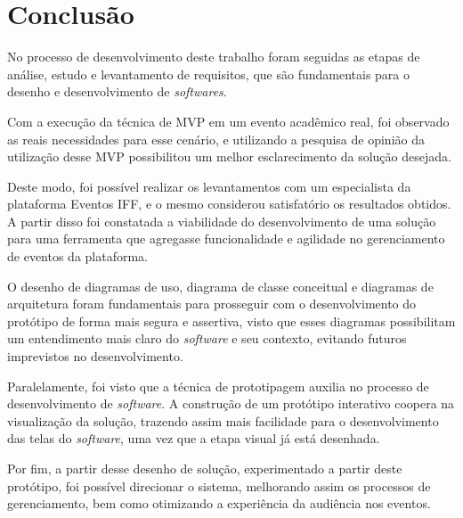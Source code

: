 \chapter{Conclusão}

No processo de desenvolvimento deste trabalho foram seguidas as etapas de análise, estudo e levantamento de requisitos, que são fundamentais para o desenho e desenvolvimento de \textit{softwares}.

Com a execução da técnica de MVP em um evento acadêmico real, foi observado as reais necessidades para esse cenário, e utilizando a pesquisa de opinião da utilização desse MVP possibilitou um melhor esclarecimento da solução desejada.

Deste modo, foi possível realizar os levantamentos com um especialista da plataforma Eventos IFF, e o mesmo considerou satisfatório os resultados obtidos. A partir disso foi constatada a viabilidade do desenvolvimento de uma solução para uma ferramenta que agregasse funcionalidade e agilidade no gerenciamento de eventos da plataforma.

O desenho de diagramas de uso, diagrama de classe conceitual e diagramas de arquitetura foram fundamentais para prosseguir com o desenvolvimento do protótipo de forma mais segura e assertiva, visto que esses diagramas possibilitam um entendimento mais claro do \textit{software} e seu contexto, evitando futuros imprevistos no desenvolvimento.

Paralelamente, foi visto que a técnica de prototipagem auxilia no processo de desenvolvimento de \textit{software}. A construção de um protótipo interativo coopera na visualização da solução, trazendo assim mais facilidade para o desenvolvimento das telas do \textit{software}, uma vez que a etapa visual já está desenhada. 

Por fim, a partir desse desenho de solução, experimentado a partir deste protótipo, foi possível direcionar o sistema, melhorando assim os processos de gerenciamento, bem como otimizando a experiência da audiência nos eventos.
